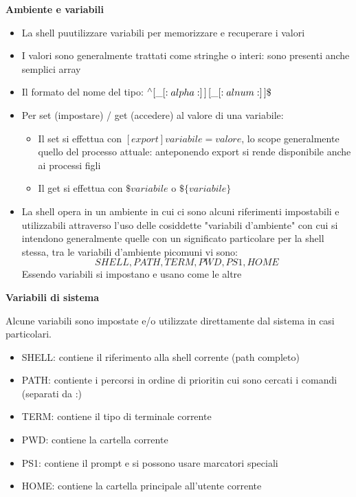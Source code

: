 \begin{flushleft}
  \textbf{Ambiente e variabili}\par 
  \begin{itemize}
    \item La shell pu\aco utilizzare variabili per memorizzare e recuperare i valori 
    \item I valori sono generalmente trattati come stringhe o interi: sono presenti anche semplici array
    \item Il formato del nome \ace del tipo: $^{\wedge}[\_[:alpha:]\,]\,[\_[:alnum:]\,]\*\$$
    \item Per set (impostare) / get (accedere) al valore di una variabile: 
          \begin{itemize}
            \item Il set si effettua con $[export] variabile=valore$, lo scope \ace generalmente quello 
                  del processo attuale: anteponendo export si rende disponibile anche ai processi figli 
            \item Il get si effettua con $\$variabile$ o $\$\{variabile\}$
          \end{itemize}
    \item La shell opera in un ambiente in cui ci sono alcuni riferimenti impostabili e utilizzabili
          attraverso l'uso delle cosiddette "variabili d'ambiente" con cui si intendono generalmente quelle
          con un significato particolare per la shell stessa, tra le variabili d'ambiente pi\acu comuni vi sono:
          $$SHELL, PATH, TERM, PWD, PS1, HOME$$
          Essendo variabili si impostano e usano come le altre
  \end{itemize}
  \textbf{Variabili di sistema} \par 
  Alcune variabili sono impostate e/o utilizzate direttamente dal sistema in casi particolari. 
  \begin{itemize}
    \item SHELL: contiene il riferimento alla shell corrente (path completo)
    \item PATH: contiente i percorsi in ordine di priorit\aca in cui sono cercati i comandi (separati da :)
    \item TERM: contiene il tipo di terminale corrente
    \item PWD: contiene la cartella corrente
    \item PS1: contiene il prompt e si possono usare marcatori speciali
    \item HOME: contiene la cartella principale all'utente corrente
  \end{itemize}
\end{flushleft}
